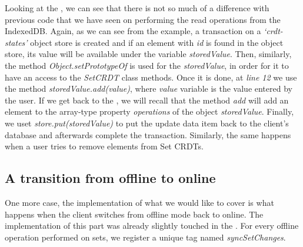 Looking at the , we can see that there is not so much of a difference with previous code that we have seen on performing the read operations from the IndexedDB. Again, as we can see from the example, a transaction on a \textit{`crdt-states'} object store is created and if an element with \textit{id} is found in the object store, its value will be available under the variable \textit{storedValue}. Then, similarly, the method \textit{Object.setPrototypeOf} is used for the \textit{storedValue}, in order for it to have an access to the \textit{SetCRDT} class methods. Once it is done, at \textit{line 12} we use the method \textit{storedValue.add(value)}, where \textit{value} variable is the value entered by the user. If we get back to the , we will recall that the method \textit{add} will add an element to the array-type property \textit{operations} of the object \textit{storedValue}. Finally, we uset \textit{store.put(storedValue)} to put the update data item back to the client's database and afterwards complete the transaction. Similarly, the same happens when a user tries to remove elements from Set CRDTs.

\subsection*{A transition from offline to online}

One more case, the implementation of what we would like to cover is what happens when the client switches from offline mode back to online. The implementation of this part was already slightly touched in the . For every offline operation performed on sets, we register a unique tag named \textit{syncSetChanges}.

